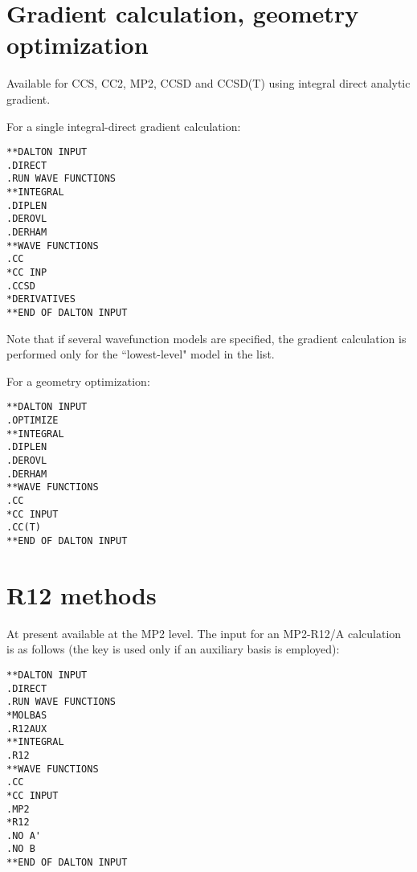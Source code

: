 \section{Gradient calculation, geometry optimization}
Available for CCS, CC2, MP2, CCSD and CCSD(T) using integral direct analytic gradient.

\noindent For a single integral-direct gradient calculation:
\begin{verbatim}
**DALTON INPUT
.DIRECT
.RUN WAVE FUNCTIONS
**INTEGRAL
.DIPLEN
.DEROVL
.DERHAM
**WAVE FUNCTIONS
.CC
*CC INP
.CCSD
*DERIVATIVES
**END OF DALTON INPUT
\end{verbatim}
Note that if several wavefunction models are specified, 
the gradient calculation is performed only for the ``lowest-level" 
model in the list.

\noindent For a geometry optimization:
\begin{verbatim}
**DALTON INPUT
.OPTIMIZE
**INTEGRAL
.DIPLEN
.DEROVL
.DERHAM
**WAVE FUNCTIONS
.CC
*CC INPUT
.CC(T)
**END OF DALTON INPUT
\end{verbatim}

\section{R12 methods}

\noindent At present available at the MP2 level. The input for
an MP2-R12/A calculation is as follows (the key  is used only if
an auxiliary basis is employed):
\begin{verbatim}
**DALTON INPUT
.DIRECT
.RUN WAVE FUNCTIONS
*MOLBAS
.R12AUX
**INTEGRAL
.R12
**WAVE FUNCTIONS
.CC
*CC INPUT
.MP2
*R12
.NO A'
.NO B
**END OF DALTON INPUT
\end{verbatim}
